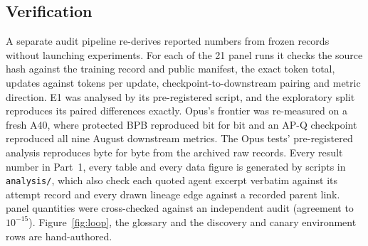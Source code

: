 \documentclass{article}
\newif\ifshowhumanmarkers \showhumanmarkersfalse
\newcommand{\humantag}[1]{{\color{humanframe}\sffamily\scriptsize\bfseries HUMAN AUTHOR MUST REWRITE/VERIFY [#1]}\ }
\newcommand{\humanauthor}[2][]{\ifshowhumanmarkers\begin{humanbox}\humantag{#1}#2\end{humanbox}\else #2\par\fi}
\newcommand{\humancaption}[1]{\ifshowhumanmarkers\humantag{#1}\fi}
\begin{document}
\subsection{Verification}\label{sec:verification}
\humanauthor[P2-07]{A separate audit pipeline re-derives reported numbers from frozen records without launching experiments. For each of the 21 panel runs it checks the source hash against the training record and public manifest, the exact token total, updates against tokens per update, checkpoint-to-downstream pairing and metric direction. E1 was analysed by its pre-registered script, and the exploratory split reproduces its paired differences exactly. Opus's frontier was re-measured on a fresh A40, where protected BPB reproduced bit for bit and an AP-Q checkpoint reproduced all nine August downstream metrics. The Opus tests' pre-registered analysis reproduces byte for byte from the archived raw records. Every result number in Part~1, every table and every data figure is generated by scripts in \texttt{analysis/}, which also check each quoted agent excerpt verbatim against its attempt record and every drawn lineage edge against a recorded parent link. \CRNCrossChecked{} panel quantities were cross-checked against an independent audit (agreement to $10^{-15}$). Figure~\ref{fig:loop}, the glossary and the discovery and canary environment rows are hand-authored.}

\begin{table}[t]
\caption{\humancaption{P2-08}Selection funnel from discovery to the reported recipes, in time order. Step 2's rule was fixed before the first AutoPareto attempt. Steps 3 and 4 were chosen after the agents' scores, and for step 4 the seeds 0--2 re-runs, were known. Step 5 was pre-registered. Counts and dates: Appendix Table~\ref{tab:funnelfull}.}\label{tab:funnel}
\centering\scriptsize\setlength{\tabcolsep}{3pt}
\end{table}
\end{document}

